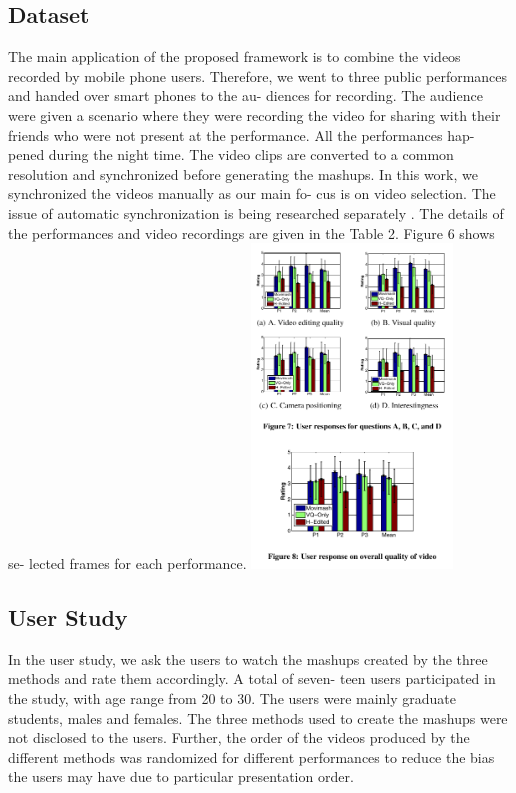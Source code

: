 \documentclass{sig-alternate}
\begin{document}
\subsection{Dataset}
The main application of the proposed framework is to combine
the videos recorded by mobile phone users. Therefore, we went to
three public performances and handed over smart phones to the au-
diences for recording. The audience were given a scenario where
they were recording the video for sharing with their friends who
were not present at the performance. All the performances hap-
pened during the night time. The video clips are converted to a
common resolution and synchronized before generating the mashups.
In this work, we synchronized the videos manually as our main fo-
cus is on video selection. The issue of automatic synchronization is
being researched separately \cite{salas:fourteen}. The details of the performances
and video recordings are given in the Table 2. Figure 6 shows se-
lected frames for each performance.
\includegraphics[width=0.4\textwidth,left]{last.pdf}

\subsection{User Study}
In the user study, we ask the users to watch the mashups created
by the three methods and rate them accordingly. A total of seven-
teen users participated in the study, with age range from 20 to 30.
The users were mainly graduate students, males and females. The
three methods used to create the mashups were not disclosed to the
users. Further, the order of the videos produced by the different
methods was randomized for different performances to reduce the
bias the users may have due to particular presentation order.
\end{document}
